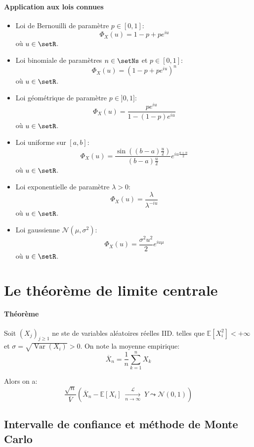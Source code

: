 \documentclass[a4paper,10pt,french,openany]{memoir}
\newcommand{\Esper}{\mathbb{E}}
\newcommand{\normale}{\mathcal{N}}
\DeclareMathOperator{\Var}{Var}
\begin{document}
\paragraph{Application aux lois connues}
\begin{itemize}
 \item Loi de Bernouilli de paramètre $p\in[0,1]$:
 \[ \Phi_X(u) = 1-p+pe^{iu} \] où $u\in\setR$.
 
 \item Loi binomiale de paramètres $n\in\setNs$ et $p\in[0,1]$:
 \[ \Phi_X(u) = (1-p + pe^{iu})^n \] où $u\in\setR$.
 
 \item Loi géométrique de paramètre $p\in]0,1]$:
 \[ \Phi_X(u) = \frac{pe^{iu}}{1-(1-p)e^{iu}} \] où $u\in\setR$.
 
 \item Loi uniforme sur $[a,b]$:
 \[ \Phi_X(u) = \frac{\sin((b-a)\frac u 2)}{(b-a)\frac u 2} e^{iu \frac{a+n}2} \] où $u\in\setR$.
 
 \item Loi exponentielle de paramètre $\lambda>0$:
 \[ \Phi_X(u) = \frac \lambda {\lambda^{-iu}} \] où $u\in\setR$.
 
 \item Loi gaussienne $\normale(\mu, \sigma^2)$:
 \[ \Phi_X(u) = \frac{\sigma^2 u^2}2 e^{iu\mu} \] où $u\in\setR$.
\end{itemize}

\section{Le théorème de limite centrale}

\paragraph{Théorème}
Soit $(X_j)_{j\geq1}$ ne ste de variables aléatoires réelles IID. telles que $\Esper[X_i^2]<+\infty$ et $\sigma=\sqrt{\Var(X_i)} > 0$. On note la moyenne empirique: \[\overline X_n = \frac1n \sum_{k=1}^n X_k\]

Alors on a:
\[\frac{\sqrt n}{\overline V} \left(\overline X_n - \Esper[X_i]\; \underset{n\to\infty}{\overset{\mathcal{L}}\to} \;Y \leadsto \normale(0, 1)\right)\]

\subsection{Intervalle de confiance et méthode de Monte Carlo}
\end{document}
